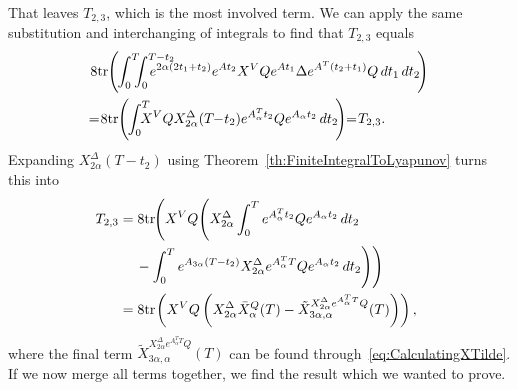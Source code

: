 \documentclass[twocolumn]{autart}
\begin{document}
\begin{pf}
\begin{align}
\end{align}
That leaves $T_{2,3}$, which is the most involved term. We can apply the same substitution and interchanging of integrals to find that $T_{2,3}$ equals
\begin{align}
& 8\tr\hspace{-2pt}\left(\hspace{-1pt}\int_0^T \hspace{-6pt} \int_0^{T-t_2} \hspace{-20pt} e^{2\alpha(2t_1+t_2)} e^{A t_2} X^V Q e^{A t_1} \Delta e^{A^T (t_2 + t_1)} Q \, dt_1 \, dt_2\hspace{-2pt}\right) \nonumber \\
& \hspace{-4pt}=\hspace{-2pt} 8\tr\hspace{-2pt}\left(\hspace{-1pt}\int_0^T \hspace{-9pt} X^V Q X_{2\alpha}^\Delta(T\hspace{-3pt}-\hspace{-2pt}t_2) e^{A_\alpha^T t_2} Q e^{A_\alpha t_2} \, dt_2 \hspace{-2pt}\right) \hspace{-2pt} \hspace{-1pt}=\hspace{-2pt} T_{2,3}.
\end{align}
Expanding $X_{2\alpha}^\Delta(T-t_2)$ using Theorem~\ref{th:FiniteIntegralToLyapunov} turns this into
\begin{align}
\hspace{-5pt} T_{2,3} & = 8\mbox{tr}\hspace{-1pt}\Bigg(X^V Q \Bigg(X_{2\alpha}^\Delta \int_0^T e^{A_\alpha^T t_2} Q e^{A_\alpha t_2} \, dt_2 \nonumber \\
& \hspace{12pt} - \int_0^T e^{A_{3\alpha}(T - t_2)} X_{2\alpha}^\Delta e^{A_\alpha^T T} Q e^{A_\alpha t_2} \, dt_2\Bigg)\Bigg) \\
& = 8\mbox{tr}\hspace{-1pt}\left(X^V Q \left(X_{2\alpha}^\Delta \bar{X}_\alpha^Q(T) - \tilde{X}_{3\alpha,\alpha}^{X_{2\alpha}^\Delta e^{A_\alpha^T T} Q}(T)\right)\right), \nonumber
\end{align}
where the final term $\tilde{X}_{3\alpha,\alpha}^{X_{2\alpha}^\Delta e^{A_\alpha^T T} Q}(T)$ can be found through~\eqref{eq:CalculatingXTilde}. If we now merge all terms together, we find the result which we wanted to prove.
\end{pf}
\end{document}

